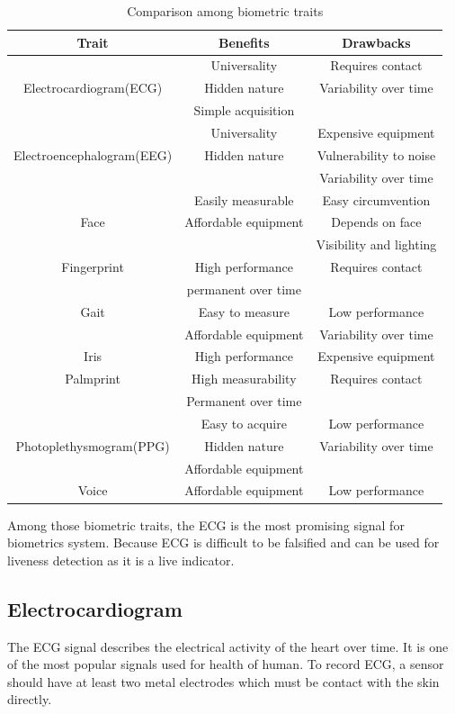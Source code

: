 \documentclass[a4paper,12pt]{article}
\begin{document}
\begin{table}

\centering
 \begin{tabular}{c c c} 
 Trait & Benefits & Drawbacks \\ [0.5ex] 
 \hline\hline
  & Universality & Requires contact \\ Electrocardiogram(ECG) & Hidden nature & Variability over time \\ & Simple acquisition & \\ 
 \hline
  & Universality & Expensive equipment \\ Electroencephalogram(EEG) & Hidden nature & Vulnerability to noise \\ &  & Variability over time \\ 
 \hline
  & Easily measurable & Easy circumvention \\ Face & Affordable equipment & Depends on face \\ & & Visibility and lighting \\ 
 \hline
  Fingerprint & High performance & Requires contact \\ & permanent over time & \\
 \hline
  Gait & Easy to measure & Low performance \\ & Affordable equipment & Variability over time \\
  \hline
  Iris & High performance & Expensive equipment \\
  \hline
  Palmprint & High measurability & Requires contact \\ & Permanent over time &  \\ 
  \hline
  & Easy to acquire & Low performance \\ Photoplethysmogram(PPG) & Hidden nature & Variability over time \\ & Affordable equipment & \\ 
  \hline
 Voice & Affordable equipment & Low performance \\ [1ex] 
 \hline
\end{tabular}
\caption{Comparison among biometric traits\autocite{Pinto:2018evolution}}
\label{tab:comparision}
\end{table}

Among those biometric traits, the ECG is the most promising signal for biometrics system\parencite{Pinto:2018evolution}. Because ECG is difficult to be falsified and can be used for liveness detection as it is a live indicator\parencite{Wang:2007analysis}. 

\subsection{Electrocardiogram}
The ECG signal describes the electrical activity of the heart over time. It is one of the most popular signals used for health of human. To record ECG, a sensor should have at least two metal electrodes which must be contact with the skin directly\parencite{Blasco:2018feasibility}.
\end{document}
